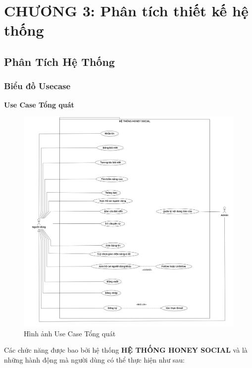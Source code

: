 \newpage
\section{CHƯƠNG 3: Phân tích thiết kế hệ thống}

\subsection{Phân Tích Hệ Thống}

\subsubsection{Biểu đồ Usecase}


\textbf{Use Case Tổng quát} \\
\begin{figure}[H]
    \centering
    \includegraphics[width=1\textwidth]{image/MoHinh/1.png}
    \caption{Hình ảnh Use Case Tổng quát}
    \label{fig:use_case_tong_quat}
\end{figure}
Các chức năng được bao bởi hệ thống \textbf{HỆ THỐNG HONEY SOCIAL} và là những hành động mà người dùng có thể thực hiện như sau:

